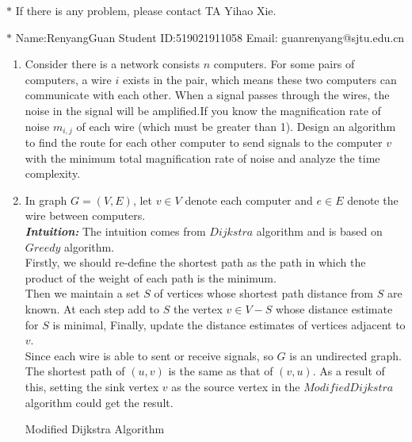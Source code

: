 \documentclass[12pt,a4paper]{article}
\makeatletter
\newtheorem*{solution}{Solution}
\theoremstyle{definition}
\renewenvironment{solution}[1][Solution] {\par\pushQED{\qed}\normalfont\topsep6\p@\@plus6\p@\relax\trivlist\item[\hskip\labelsep\bfseries#1\@addpunct{.}]\ignorespaces}{\popQED\endtrivlist\@endpefalse} \makeatother
\makeatother
\begin{document}
\noindent

\noindent{}
\begin{center}
\footnotesize{\color{red}$*$ If there is any problem, please contact TA Yihao Xie. }

\footnotesize{\color{blue}$*$ Name:RenyangGuan  \quad Student ID:519021911058 \quad Email: guanrenyang@sjtu.edu.cn}
\end{center}

\begin{enumerate}
    \item  Consider there is a network consists $n$ computers. For some pairs of computers, a wire $i$ exists in the pair, which means these two computers can communicate with each other. When a signal passes through the wires, the noise in the signal will be amplified.If you know the magnification rate of noise $m_{i,j}$ of each wire (which must be greater than 1). Design an algorithm to find the route  for each other computer to send signals to the computer $v$ with the minimum total magnification rate of noise and analyze the time complexity.
	\begin{solution}
	In graph $G=(V,E)$, let $v\in V$ denote each computer and $e\in E$ denote the wire between computers. 
	\\
	\textbf{\textit{Intuition:}}
	The intuition comes from $Dijkstra$ algorithm and is based on $Greedy$ algorithm. 
	\\
	Firstly, we should re-define the shortest path as the path in which the product of the weight of each path is the minimum.
	\\
	Then we maintain a set $S$ of vertices whose shortest path distance from $S$ are known. At each step add to $S$ the vertex $v\in V-S$ whose distance estimate for $S$ is minimal, Finally, update the distance estimates of vertices adjacent to $v$.
	\\
	Since each wire is able to sent or receive signals, so $G$ is an undirected graph. The shortest path of $(u,v)$ is the same as that of $(v,u)$. As a result of this, setting the sink vertex $v$ as the source vertex in the $Modified Dijkstra$ algorithm could get the result.
	\\
	\begin{algorithm}[H]
	        \caption{Modified Dijkstra Algorithm}\label{Alg-SHORSTPATH}
	

\end{algorithm}
\end{solution}
\end{enumerate}
\end{document}
